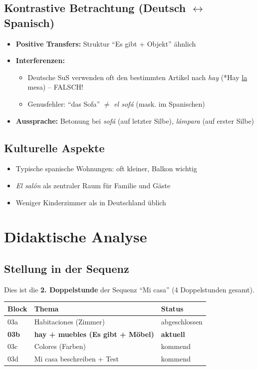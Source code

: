 \documentclass[11pt,a4paper]{article}
\newcommand{\reihenthema}{Mi casa}
\begin{document}
\subsection{Kontrastive Betrachtung (Deutsch $\leftrightarrow$ Spanisch)}
\begin{itemize}
    \item \textbf{Positive Transfers:} Struktur ``Es gibt + Objekt'' ähnlich
    \item \textbf{Interferenzen:}
    \begin{itemize}
        \item Deutsche SuS verwenden oft den bestimmten Artikel nach \textit{hay} (*Hay \underline{la} mesa) -- FALSCH!
        \item Genusfehler: ``das Sofa'' $\neq$ \textit{el sofá} (mask. im Spanischen)
    \end{itemize}
    \item \textbf{Aussprache:} Betonung bei \textit{sofá} (auf letzter Silbe), \textit{lámpara} (auf erster Silbe)
\end{itemize}

\subsection{Kulturelle Aspekte}
\begin{itemize}
    \item Typische spanische Wohnungen: oft kleiner, Balkon wichtig
    \item \textit{El salón} als zentraler Raum für Familie und Gäste
    \item Weniger Kinderzimmer als in Deutschland üblich
\end{itemize}

\section{Didaktische Analyse}

\subsection{Stellung in der Sequenz}
Dies ist die \textbf{2. Doppelstunde} der Sequenz ``\reihenthema'' (4 Doppelstunden gesamt).

\begin{tabular}{|l|l|l|}
\hline
\textbf{Block} & \textbf{Thema} & \textbf{Status} \\
\hline
03a & Habitaciones (Zimmer) & abgeschlossen \\
\hline
\textbf{03b} & \textbf{hay + muebles (Es gibt + Möbel)} & \textbf{aktuell} \\
\hline
03c & Colores (Farben) & kommend \\
\hline
03d & Mi casa beschreiben + Test & kommend \\
\hline
\end{tabular}
\end{document}
